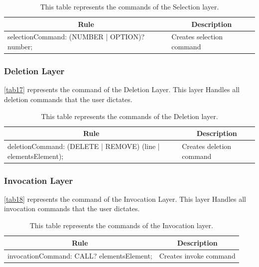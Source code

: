 \begin{table}[H]
	\centering
	\begin{tabular}{|p{8cm}|p{7cm}|}
		\hline
		\multicolumn{1}{|c|}{{\bf Rule}}             & \multicolumn{1}{c|}{{\bf Description}} \\ \hline
		selectionCommand: (NUMBER | OPTION)? number; & Creates selection command              \\ \hline
	\end{tabular}
		\caption{This table represents the commands of the Selection layer.}
		\label{tab16}
\end{table}

\subsubsection{Deletion Layer}
\autoref{tab17} represents the command of the Deletion Layer.  This layer Handles all deletion commands that the user dictates.

\begin{table}[H]
	\centering
	\begin{tabular}{|p{8cm}|p{7cm}|}
		\hline
		\multicolumn{1}{|c|}{{\bf Rule}}                             & \multicolumn{1}{c|}{{\bf Description}} \\ \hline
		deletionCommand: (DELETE | REMOVE) (line | elementsElement); & Creates deletion command               \\ \hline
	\end{tabular}
		\caption{This table represents the commands of the Deletion layer.}
		\label{tab17}
\end{table}

\subsubsection{Invocation Layer}
\autoref{tab18} represents the command of the Invocation Layer.  This layer Handles all invocation commands that the user dictates.

\begin{table}[H]
	\centering
	\begin{tabular}{|p{8cm}|p{7cm}|}
		\hline
		\multicolumn{1}{|c|}{{\bf Rule}}          & \multicolumn{1}{c|}{{\bf Description}} \\ \hline
		invocationCommand: CALL? elementsElement; & Creates invoke command                 \\ \hline
	\end{tabular}
		\caption{This table represents the commands of the Invocation layer.}
		\label{tab18}
\end{table}

